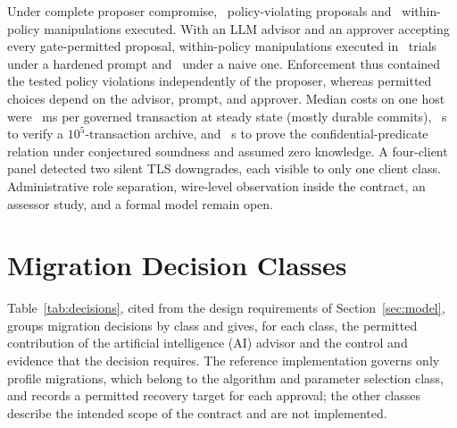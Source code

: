 \documentclass[journal]{IEEEtran}
\begin{document}
Under complete proposer compromise, \AdvCompViolExecuted\ policy-violating proposals and \AdvCompInPolicyExecuted\ within-policy manipulations executed. With an LLM advisor and an approver accepting every gate-permitted proposal, within-policy manipulations executed in \AdvHardInPolicyExecuted\ trials under a hardened prompt and \AdvNaiveInPolicyExecuted\ under a naive one. Enforcement thus contained the tested policy violations independently of the proposer, whereas permitted choices depend on the advisor, prompt, and approver. Median costs on one host were \TimDurTotal~ms per governed transaction at steady state (mostly durable commits), \ScalHundredKMedR~s to verify a $10^5$-transaction archive, and \ZkProveMed~s to prove the confidential-predicate relation under conjectured soundness and assumed zero knowledge. A four-client panel detected two silent TLS downgrades, each visible to only one client class. Administrative role separation, wire-level observation inside the contract, an assessor study, and a formal model remain open.

\appendices
\section{Migration Decision Classes}
\label{s:decisions}
Table~\ref{tab:decisions}, cited from the design requirements of Section~\ref{sec:model}, groups migration decisions by class and gives, for each class, the permitted contribution of the artificial intelligence (AI) advisor and the control and evidence that the decision requires. The reference implementation governs only profile migrations, which belong to the algorithm and parameter selection class, and records a permitted recovery target for each approval; the other classes describe the intended scope of the contract and are not implemented.
\end{document}
